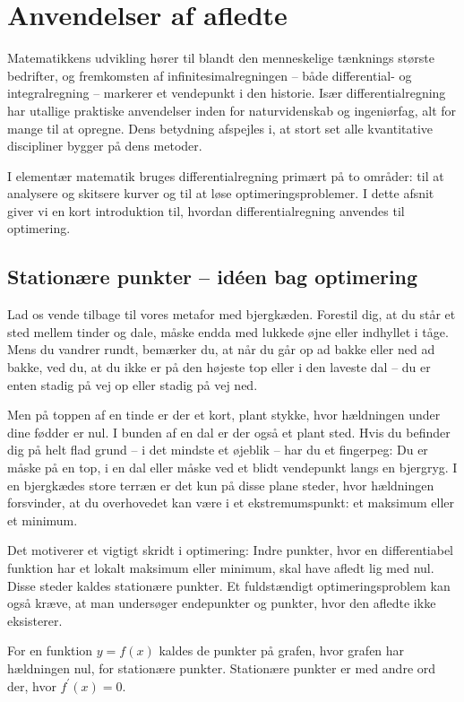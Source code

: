 \section{Anvendelser af afledte}
\label{sec:ch10-applications}

Matematikkens udvikling hører til blandt den menneskelige tænknings største bedrifter, og fremkomsten af infinitesimalregningen -- både differential- og integralregning -- markerer et vendepunkt i den historie. Især differentialregning har utallige praktiske anvendelser inden for naturvidenskab og ingeniørfag, alt for mange til at opregne. Dens betydning afspejles i, at stort set alle kvantitative discipliner bygger på dens metoder.

I elementær matematik bruges differentialregning primært på to områder: til at analysere og skitsere kurver og til at løse optimeringsproblemer. I dette afsnit giver vi en kort introduktion til, hvordan differentialregning anvendes til optimering.


\subsection*{Stationære punkter -- idéen bag optimering}
Lad os vende tilbage til vores metafor med bjergkæden. Forestil dig, at du står et sted mellem tinder og dale, måske endda med lukkede øjne eller indhyllet i tåge. Mens du vandrer rundt, bemærker du, at når du går op ad bakke eller ned ad bakke, ved du, at du ikke er på den højeste top eller i den laveste dal -- du er enten stadig på vej op eller stadig på vej ned.

Men på toppen af en tinde er der et kort, plant stykke, hvor hældningen under dine fødder er nul. I bunden af en dal er der også et plant sted. Hvis du befinder dig på helt flad grund -- i det mindste et øjeblik -- har du et fingerpeg: Du er måske på en top, i en dal eller måske ved et blidt vendepunkt langs en bjergryg. I en bjergkædes store terræn er det kun på disse plane steder, hvor hældningen forsvinder, at du overhovedet kan være i et ekstremumspunkt: et maksimum eller et minimum.

Det motiverer et vigtigt skridt i optimering: Indre punkter, hvor en differentiabel funktion har et lokalt maksimum eller minimum, skal have afledt lig med nul. Disse steder kaldes stationære punkter. Et fuldstændigt optimeringsproblem kan også kræve, at man undersøger endepunkter og punkter, hvor den afledte ikke eksisterer.

\begin{definition}
     For en funktion $y=f(x)$ kaldes de punkter på grafen, hvor grafen har hældningen nul, for stationære punkter. Stationære punkter er med andre ord der, hvor $f^{\prime}(x)=0$.
    \end{definition}

